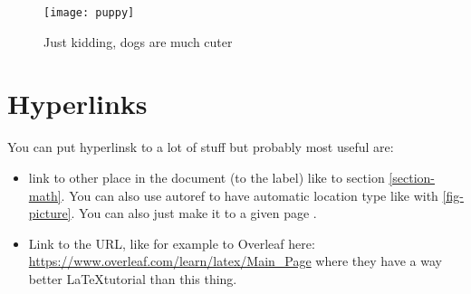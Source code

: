 \begin{figure}[h]
  \centering
  \texttt{[image: puppy]}
  
  \caption{\label{fig-picture}Just kidding, dogs are much cuter}
\end{figure}

\section{Hyperlinks}

You can put hyperlinsk to a lot of stuff but probably most useful are:
\begin{itemize}
  \item link to other place in the document (to the label) like to section \ref{section-math}. You can also use autoref to have automatic location type like with \autoref{fig-picture}. You can also just make it to a given page \pageref{fig-picture}.
  \item Link to the URL, like for example to Overleaf here: \url{https://www.overleaf.com/learn/latex/Main_Page} where they have a way better \LaTeX tutorial than this thing.
\end{itemize}